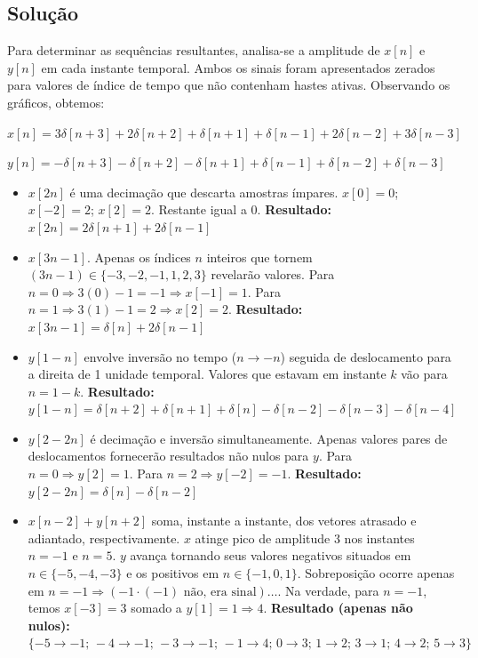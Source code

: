 \documentclass[tcc]{classe_uftex/uftex}
\begin{document}
\subsection*{Solução}

Para determinar as sequências resultantes, analisa-se a amplitude de $x[n]$ e $y[n]$ em cada instante temporal. Ambos os sinais foram apresentados zerados para valores de índice de tempo que não contenham hastes ativas. Observando os gráficos, obtemos:

$x[n] = 3\delta[n+3] + 2\delta[n+2] + \delta[n+1] + \delta[n-1] + 2\delta[n-2] + 3\delta[n-3]$

$y[n] = -\delta[n+3] - \delta[n+2] - \delta[n+1] + \delta[n-1] + \delta[n-2] + \delta[n-3]$

\begin{itemize}
    \item[\textbf{a)}] $x[2n]$ é uma decimação que descarta amostras ímpares.
    $x[0] = 0$; $x[-2] = 2$; $x[2] = 2$. Restante igual a 0.
    \textbf{Resultado:} $x[2n] = 2\delta[n+1] + 2\delta[n-1]$

    \item[\textbf{b)}] $x[3n-1]$. Apenas os índices $n$ inteiros que tornem $(3n-1) \in \{-3,-2,-1,1,2,3\}$ revelarão valores.
    Para $n=0 \Rightarrow 3(0)-1 = -1 \Rightarrow x[-1] = 1$.
    Para $n=1 \Rightarrow 3(1)-1 = 2 \Rightarrow x[2] = 2$.
    \textbf{Resultado:} $x[3n-1] = \delta[n] + 2\delta[n-1]$

    \item[\textbf{c)}] $y[1-n]$ envolve inversão no tempo ($n \to -n$) seguida de deslocamento para a direita de 1 unidade temporal. Valores que estavam em instante $k$ vão para $n = 1-k$.
    \textbf{Resultado:} $y[1-n] = \delta[n+2] + \delta[n+1] + \delta[n] - \delta[n-2] - \delta[n-3] - \delta[n-4]$

    \item[\textbf{d)}] $y[2-2n]$ é decimação e inversão simultaneamente. Apenas valores pares de deslocamentos fornecerão resultados não nulos para $y$.
    Para $n=0 \Rightarrow y[2] = 1$.
    Para $n=2 \Rightarrow y[-2] = -1$.
    \textbf{Resultado:} $y[2-2n] = \delta[n] - \delta[n-2]$

    \item[\textbf{e)}] $x[n-2] + y[n+2]$ soma, instante a instante, dos vetores atrasado e adiantado, respectivamente.
    $x$ atinge pico de amplitude 3 nos instantes $n = -1$ e $n = 5$.
    $y$ avança tornando seus valores negativos situados em $n \in \{-5, -4, -3\}$ e os positivos em $n \in \{-1, 0, 1\}$.
    Sobreposição ocorre apenas em $n=-1 \Rightarrow (-1 \cdot (-1) \text{ não, era sinal}) \dots$. Na verdade, para $n=-1$, temos $x[-3]=3$ somado a $y[1]=1 \Rightarrow 4$.
    \textbf{Resultado (apenas não nulos):} $\{-5 \to -1; \, -4 \to -1; \, -3 \to -1; \, -1 \to 4; \, 0 \to 3; \, 1 \to 2; \, 3 \to 1; \, 4 \to 2; \, 5 \to 3\}$


\end{itemize}
\end{document}
